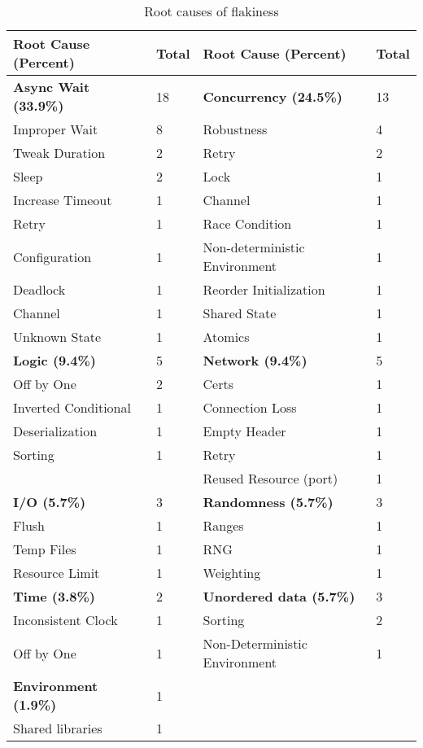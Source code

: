 \begin{table}[htbp]
\centering
\scriptsize
\caption{Root causes of flakiness }
\begin{tabular}{@{}llll@{}}
\toprule
\textbf{Root Cause (Percent)} & \textbf{Total} & \textbf{Root Cause (Percent)} & \textbf{Total} \\ \midrule
\textbf{Async Wait (33.9\%)} & 18 & \textbf{Concurrency (24.5\%)} & 13 \\
\quad Improper Wait & 8 & \quad Robustness & 4 \\
\quad Tweak Duration & 2 & \quad Retry & 2 \\
\quad Sleep & 2 & \quad Lock & 1 \\
\quad Increase Timeout & 1 & \quad Channel & 1 \\
\quad Retry & 1 & \quad Race Condition & 1 \\
\quad Configuration & 1 & \quad Non-deterministic Environment & 1 \\
\quad Deadlock & 1 & \quad Reorder Initialization & 1 \\
\quad Channel & 1 & \quad Shared State & 1 \\
\quad Unknown State & 1 & \quad Atomics & 1 \\
\textbf{Logic (9.4\%)} & 5 & \textbf{Network (9.4\%)} & 5 \\
\quad Off by One & 2 & \quad Certs & 1 \\
\quad Inverted Conditional & 1 & \quad Connection Loss & 1 \\
\quad Deserialization & 1 & \quad Empty Header & 1 \\
\quad Sorting & 1 & \quad Retry & 1 \\
 & & \quad Reused Resource (port) & 1 \\
\textbf{I/O (5.7\%)} & 3 & \textbf{Randomness (5.7\%)} & 3 \\
\quad Flush & 1 & \quad Ranges & 1 \\
\quad Temp Files & 1 & \quad RNG & 1 \\
\quad Resource Limit & 1 & \quad Weighting & 1 \\
\textbf{Time (3.8\%)} & 2 & \textbf{Unordered data (5.7\%)} & 3 \\
\quad Inconsistent Clock & 1 & \quad Sorting & 2 \\
\quad Off by One & 1 & \quad Non-Deterministic Environment & 1 \\
\textbf{Environment (1.9\%)} & 1 & & \\
\quad Shared libraries & 1 & & \\
\bottomrule
\end{tabular}
\label{root-cause}
\end{table}